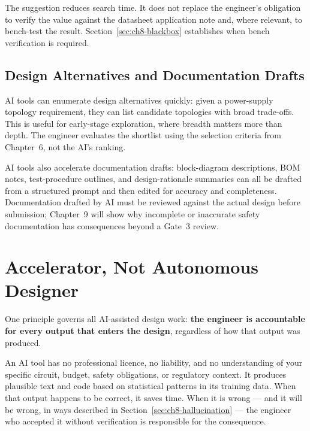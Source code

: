 The suggestion reduces search time.
It does not replace the engineer's obligation to verify the value against the
datasheet application note and, where relevant, to bench-test the result.
Section~\ref{sec:ch8-blackbox} establishes when bench verification is required.

\subsection{Design Alternatives and Documentation Drafts}
\label{sec:ch8-helps-docs}

AI tools can enumerate design alternatives quickly: given a power-supply
topology requirement, they can list candidate topologies with broad trade-offs.
This is useful for early-stage exploration, where breadth matters more than
depth.
The engineer evaluates the shortlist using the selection criteria from
Chapter~6, not the AI's ranking.

AI tools also accelerate documentation drafts: block-diagram descriptions,
BOM notes, test-procedure outlines, and design-rationale summaries can all be
drafted from a structured prompt and then edited for accuracy and completeness.
Documentation drafted by AI must be reviewed against the actual design
before submission; Chapter~9 will show why incomplete or inaccurate
safety documentation has consequences beyond a Gate~3 review.

\section{Accelerator, Not Autonomous Designer}
\label{sec:ch8-accelerator}

One principle governs all AI-assisted design work: \textbf{the engineer is
accountable for every output that enters the design},
regardless of how that output was produced.

An AI tool has no professional licence, no liability, and no understanding of
your specific circuit, budget, safety obligations, or regulatory context.
It produces plausible text and code based on statistical patterns in its
training data.
When that output happens to be correct, it saves time.
When it is wrong --- and it will be wrong, in ways described in
Section~\ref{sec:ch8-hallucination} --- the engineer who accepted it without
verification is responsible for the consequence.


